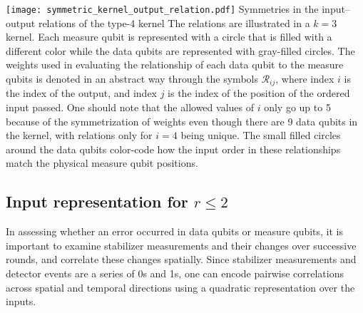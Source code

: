 \begin{figure*}[htb]
\centering
\texttt{[image: symmetric\_kernel\_output\_relation.pdf]}
\ccaption
{Symmetries in the input--output relations of the type-4 kernel}
{
The relations are illustrated in a $k=3$ kernel. Each measure qubit is represented with a circle that is filled with a different color while the data qubits are represented with gray-filled circles. The weights used in evaluating the relationship of each data qubit to the measure qubits is denoted in an abstract way through the symbols $\mathcal{R}_{ij}$, where index $i$ is the index of the output, and index $j$ is the index of the position of the ordered input passed. One should note that the allowed values of $i$ only go up to 5 because of the symmetrization of weights even though there are 9 data qubits in the kernel, with relations only for $i=4$ being unique. The small filled circles around the data qubits color-code how the input order in these relationships match the physical measure qubit positions.
}
\label{fig:t4kernslsym}
\end{figure*}



\subsection{Input representation for $r \leq 2$}
\label{sec:kernels-r2}

In assessing whether an error occurred in data qubits or measure qubits, it is important to examine stabilizer measurements and their changes over successive rounds, and correlate these changes spatially. Since stabilizer measurements and detector events are a series of 0s and 1s, one can encode pairwise correlations across spatial and temporal directions using a quadratic representation over the inputs.

